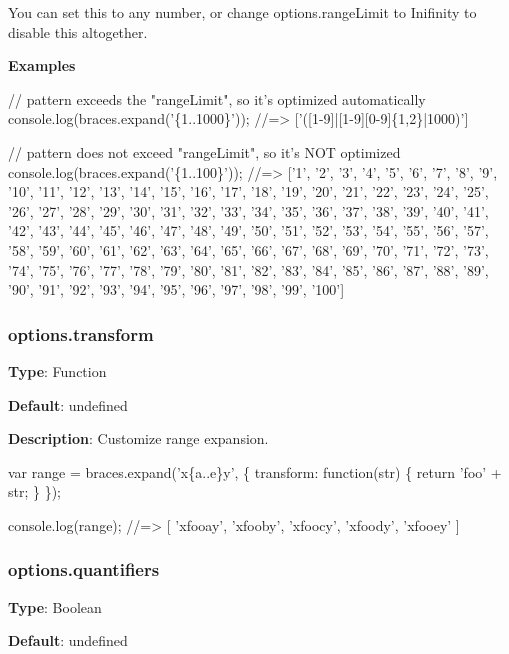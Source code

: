 You can set this to any number, or change {\ttfamily options.\+range\+Limit} to {\ttfamily Inifinity} to disable this altogether.

{\bfseries Examples}


\begin{DoxyCode}
// pattern exceeds the "rangeLimit", so it's optimized automatically
console.log(braces.expand('\{1..1000\}'));
//=> ['([1-9]|[1-9][0-9]\{1,2\}|1000)']

// pattern does not exceed "rangeLimit", so it's NOT optimized
console.log(braces.expand('\{1..100\}'));
//=> ['1', '2', '3', '4', '5', '6', '7', '8', '9', '10', '11', '12', '13', '14', '15', '16', '17', '18',
       '19', '20', '21', '22', '23', '24', '25', '26', '27', '28', '29', '30', '31', '32', '33', '34', '35', '36',
       '37', '38', '39', '40', '41', '42', '43', '44', '45', '46', '47', '48', '49', '50', '51', '52', '53', '54',
       '55', '56', '57', '58', '59', '60', '61', '62', '63', '64', '65', '66', '67', '68', '69', '70', '71', '72',
       '73', '74', '75', '76', '77', '78', '79', '80', '81', '82', '83', '84', '85', '86', '87', '88', '89', '90',
       '91', '92', '93', '94', '95', '96', '97', '98', '99', '100']
\end{DoxyCode}


\subsubsection*{options.\+transform}

{\bfseries Type}\+: {\ttfamily Function}

{\bfseries Default}\+: {\ttfamily undefined}

{\bfseries Description}\+: Customize range expansion.


\begin{DoxyCode}
var range = braces.expand('x\{a..e\}y', \{
  transform: function(str) \{
    return 'foo' + str;
  \}
\});

console.log(range);
//=> [ 'xfooay', 'xfooby', 'xfoocy', 'xfoody', 'xfooey' ]
\end{DoxyCode}


\subsubsection*{options.\+quantifiers}

{\bfseries Type}\+: {\ttfamily Boolean}

{\bfseries Default}\+: {\ttfamily undefined}

